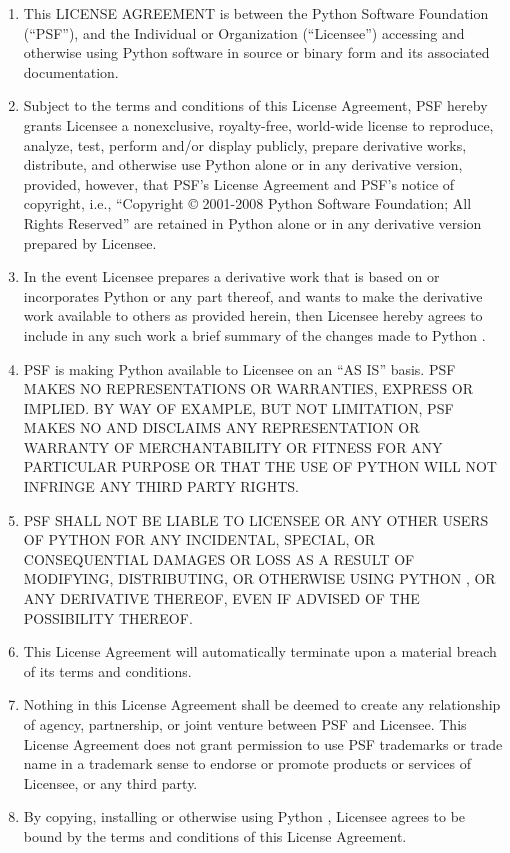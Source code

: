 \begin{enumerate}
\item
This LICENSE AGREEMENT is between the Python Software Foundation
(``PSF''), and the Individual or Organization (``Licensee'') accessing
and otherwise using Python \version{} software in source or binary
form and its associated documentation.

\item
Subject to the terms and conditions of this License Agreement, PSF
hereby grants Licensee a nonexclusive, royalty-free, world-wide
license to reproduce, analyze, test, perform and/or display publicly,
prepare derivative works, distribute, and otherwise use Python
\version{} alone or in any derivative version, provided, however, that
PSF's License Agreement and PSF's notice of copyright, i.e.,
``Copyright \copyright{} 2001-2008 Python Software Foundation; All
Rights Reserved'' are retained in Python \version{} alone or in any
derivative version prepared by Licensee.

\item
In the event Licensee prepares a derivative work that is based on
or incorporates Python \version{} or any part thereof, and wants to
make the derivative work available to others as provided herein, then
Licensee hereby agrees to include in any such work a brief summary of
the changes made to Python \version.

\item
PSF is making Python \version{} available to Licensee on an ``AS IS''
basis.  PSF MAKES NO REPRESENTATIONS OR WARRANTIES, EXPRESS OR
IMPLIED.  BY WAY OF EXAMPLE, BUT NOT LIMITATION, PSF MAKES NO AND
DISCLAIMS ANY REPRESENTATION OR WARRANTY OF MERCHANTABILITY OR FITNESS
FOR ANY PARTICULAR PURPOSE OR THAT THE USE OF PYTHON \version{} WILL
NOT INFRINGE ANY THIRD PARTY RIGHTS.

\item
PSF SHALL NOT BE LIABLE TO LICENSEE OR ANY OTHER USERS OF PYTHON
\version{} FOR ANY INCIDENTAL, SPECIAL, OR CONSEQUENTIAL DAMAGES OR
LOSS AS A RESULT OF MODIFYING, DISTRIBUTING, OR OTHERWISE USING PYTHON
\version, OR ANY DERIVATIVE THEREOF, EVEN IF ADVISED OF THE
POSSIBILITY THEREOF.

\item
This License Agreement will automatically terminate upon a material
breach of its terms and conditions.

\item
Nothing in this License Agreement shall be deemed to create any
relationship of agency, partnership, or joint venture between PSF and
Licensee.  This License Agreement does not grant permission to use PSF
trademarks or trade name in a trademark sense to endorse or promote
products or services of Licensee, or any third party.

\item
By copying, installing or otherwise using Python \version, Licensee
agrees to be bound by the terms and conditions of this License
Agreement.
\end{enumerate}


